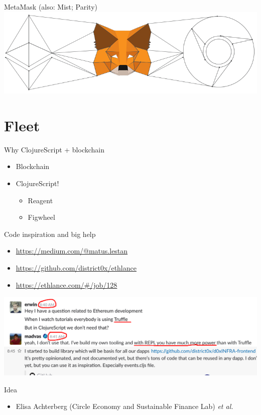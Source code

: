 \documentclass[presentation]{beamer}
\begin{document}
\begin{frame}[label=sec-2-5]{MetaMask (also: Mist; Parity)}
\includegraphics[width=.9\linewidth]{../images/metamask.png}
\end{frame}

\section{Fleet}
\label{sec-3}
\begin{frame}[label=sec-3-1]{Why ClojureScript + blockchain}
\begin{itemize}
\item \alert{Blockchain}
\item \alert{ClojureScript}!
\begin{itemize}
\item Reagent
\item Figwheel
\end{itemize}
\end{itemize}
\end{frame}

\begin{frame}[label=sec-3-2]{Code inspiration and big help}
\begin{itemize}
\item \url{https://medium.com/@matus.lestan}
\item \url{https://github.com/district0x/ethlance}
\item \url{https://ethlance.com/\#/job/128}
\end{itemize}

\includegraphics[width=.9\linewidth]{../images/madvas.png}
\end{frame}
\begin{frame}[label=sec-3-3]{Idea}
\begin{itemize}
\item Elisa Achterberg (Circle Economy and Sustainable Finance Lab) \emph{et al.}
\end{itemize}
\end{frame}
\end{document}
